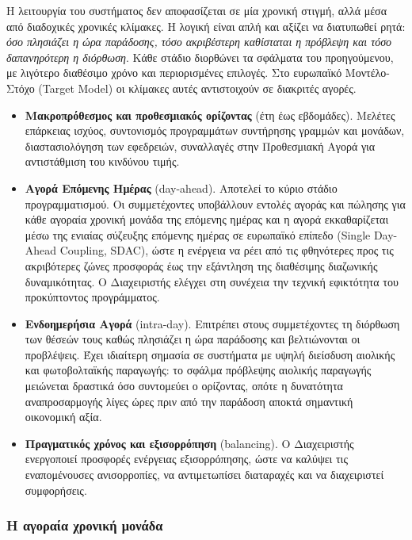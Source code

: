 Η λειτουργία του συστήματος δεν αποφασίζεται σε μία χρονική στιγμή, αλλά μέσα από
διαδοχικές χρονικές κλίμακες. Η λογική είναι απλή και αξίζει να διατυπωθεί ρητά: \emph{όσο
πλησιάζει η ώρα παράδοσης, τόσο ακριβέστερη καθίσταται η πρόβλεψη και τόσο δαπανηρότερη η
διόρθωση}. Κάθε στάδιο διορθώνει τα σφάλματα του προηγούμενου, με λιγότερο διαθέσιμο χρόνο
και περιορισμένες επιλογές. Στο ευρωπαϊκό Μοντέλο-Στόχο (Target Model) οι κλίμακες αυτές
αντιστοιχούν σε διακριτές αγορές.

\begin{itemize}
\item \textbf{Μακροπρόθεσμος και προθεσμιακός ορίζοντας} (έτη έως εβδομάδες). Μελέτες
      επάρκειας ισχύος, συντονισμός προγραμμάτων συντήρησης γραμμών και μονάδων, διαστασιολόγηση
      των εφεδρειών, συναλλαγές στην Προθεσμιακή Αγορά για αντιστάθμιση του κινδύνου τιμής.
\item \textbf{Αγορά Επόμενης Ημέρας} (day-ahead). Αποτελεί το κύριο στάδιο
      προγραμματισμού. Οι συμμετέχοντες υποβάλλουν εντολές αγοράς και πώλησης για κάθε
      αγοραία χρονική μονάδα της επόμενης ημέρας και η αγορά εκκαθαρίζεται μέσω της ενιαίας
      σύζευξης επόμενης ημέρας σε ευρωπαϊκό επίπεδο (Single Day-Ahead Coupling, SDAC),
      ώστε η ενέργεια να ρέει από τις φθηνότερες προς τις ακριβότερες ζώνες προσφοράς έως
      την εξάντληση της διαθέσιμης διαζωνικής δυναμικότητας. Ο
      Διαχειριστής ελέγχει στη συνέχεια την τεχνική εφικτότητα του προκύπτοντος
      προγράμματος.
\item \textbf{Ενδοημερήσια Αγορά} (intra-day). Επιτρέπει στους συμμετέχοντες τη διόρθωση των θέσεών τους καθώς
      πλησιάζει η ώρα παράδοσης και βελτιώνονται οι προβλέψεις. Έχει ιδιαίτερη σημασία σε
      συστήματα με υψηλή διείσδυση αιολικής και φωτοβολταϊκής παραγωγής: το σφάλμα
      πρόβλεψης αιολικής παραγωγής μειώνεται δραστικά όσο συντομεύει ο ορίζοντας, οπότε η
      δυνατότητα αναπροσαρμογής λίγες ώρες πριν από την παράδοση αποκτά σημαντική
      οικονομική αξία.
\item \textbf{Πραγματικός χρόνος και εξισορρόπηση} (balancing). Ο Διαχειριστής ενεργοποιεί
      προσφορές ενέργειας εξισορρόπησης, ώστε να καλύψει τις εναπομένουσες
      ανισορροπίες, να
      αντιμετωπίσει διαταραχές και να διαχειριστεί συμφορήσεις.
\end{itemize}

\subsubsection*{Η αγοραία χρονική μονάδα}

